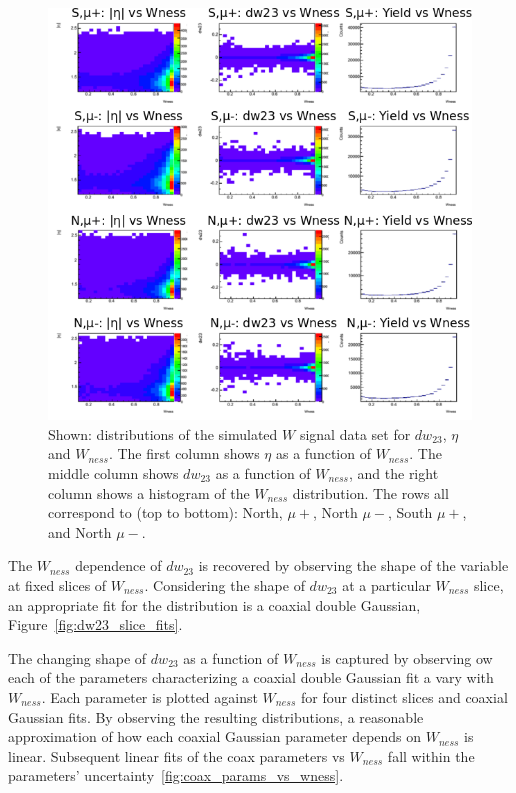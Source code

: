 \begin{figure}[ht]
  \centering
  \includegraphics[width=\linewidth]{./figures/dw23_vs_wness_simulation.png}
  \caption{
    Shown: distributions of the simulated $W$ signal data set for $dw_{23}$,
    $\eta$ and $W_{ness}$.  The first column shows $\eta$ as a function of
    $W_{ness}$. The middle column shows $dw_{23}$ as a function of $W_{ness}$,
    and the right column shows a histogram of the $W_{ness}$ distribution. The
    rows all correspond to (top to bottom): North, $\mu+$, North $\mu-$, South
    $\mu+$, and North $\mu-$.
  }
  \label{fig:dw23_eta_wness_sim}
\end{figure}

The $W_{ness}$ dependence of $dw_{23}$ is recovered by observing the shape of
the variable at fixed slices of $W_{ness}$. Considering the shape of $dw_{23}$
at a particular $W_{ness}$ slice, an appropriate fit for the distribution is a
coaxial double Gaussian, Figure~\ref{fig:dw23_slice_fits}. 

The changing shape of $dw_{23}$ as a function of $W_{ness}$ is captured by
observing ow each of the parameters characterizing a coaxial double Gaussian fit
a vary with $W_{ness}$. Each parameter is plotted against $W_{ness}$ for four
distinct slices and coaxial Gaussian fits. By observing the resulting
distributions, a reasonable approximation of how each coaxial Gaussian parameter
depends on $W_{ness}$ is linear. Subsequent linear fits of the coax parameters
vs $W_{ness}$ fall within the parameters'
uncertainty~\ref{fig:coax_params_vs_wness}. 

